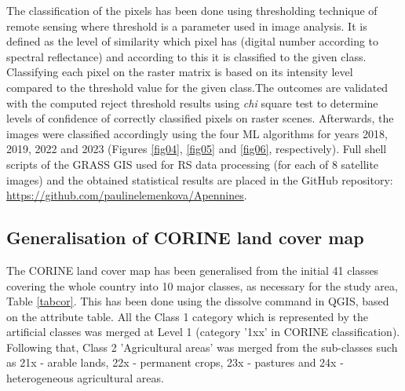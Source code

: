 \documentclass[remotesensing,article,submit,pdftex,moreauthors]{Definitions/mdpi}
\begin{document}
{The classification of the pixels has been done using thresholding technique of remote sensing where threshold is a parameter used in image analysis. It is defined as the level of similarity which pixel has (digital number according to spectral reflectance) and according to this it is classified to the given class. Classifying each pixel on the raster matrix is based on its intensity level compared to the threshold value for the given class.}The outcomes are validated with the computed reject threshold results using \emph{chi} square test to determine levels of confidence of correctly classified pixels on raster scenes. Afterwards, the images were classified accordingly {using the four ML algorithms for years} {2018}, 2019, 2022 and 2023 (Figures \ref{fig04}, \ref{fig05} and \ref{fig06}, respectively{). }Full shell scripts of the GRASS GIS used for RS data processing (for each of 8 satellite images) and the obtained statistical results are placed in the GitHub repository: \href{https://github.com/paulinelemenkova/Apennines}{https://github.com/paulinelemenkova/Apennines}.

\subsection{{Generalisation of CORINE land cover map}}

The {CORINE land cover map} has been generalised from the initial 41 classes covering the whole country into 10 major classes, as necessary for the study area{, Table} \ref{tabcor}. {This has been done using the dissolve command in QGIS, based on the attribute table}. {All} the Class 1 category which is represented by the artificial classes was merged at Level 1 (category '1xx' in CORINE classification{)}.{ }Following that, Class 2 'Agricultural areas' was merged from the sub-classes such as 21x - arable lands, 22x - permanent crops, 23x - pastures and 24x - heterogeneous agricultural areas{.}
\end{document}
